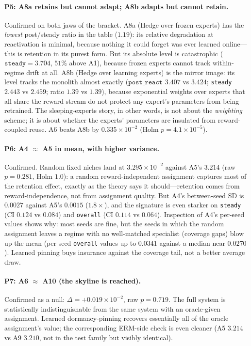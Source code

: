 \paragraph{P5: A8a retains but cannot adapt; A8b adapts but cannot retain.}
Confirmed on both jaws of the bracket. A8a (Hedge over frozen experts) has
the \emph{lowest} post/steady ratio in the table ($1.19$): its relative
degradation at reactivation is minimal, because nothing it could forget was
ever learned online---this is retention in its purest form. But its absolute
level is catastrophic ($\texttt{steady} = 3.704$, $51\%$ above A1), because
frozen experts cannot track within-regime drift at all. A8b (Hedge over
learning experts) is the mirror image: its level tracks the monolith almost
exactly ($\texttt{post\_react}$ $3.407$ vs $3.424$; \texttt{steady} $2.443$
vs $2.459$; ratio $1.39$ vs $1.39$), because exponential weights over
experts that all share the reward stream do not protect any expert's
parameters from being retrained. The sleeping-experts story, in other words,
is not about the \emph{weighting} scheme; it is about whether the experts'
parameters are insulated from reward-coupled reuse. A6 beats A8b by
$0.335\times 10^{-2}$ (Holm $p = 4.1\times 10^{-5}$).

\paragraph{P6: A4 $\approx$ A5 in mean, with higher variance.}
\label{sec:dd5-e1-a4}
Confirmed. Random fixed niches land at $3.295 \times 10^{-2}$ against A5's
$3.214$ (raw $p = 0.281$, Holm $1.0$): a random reward-independent
assignment captures most of the retention effect, exactly as the theory
says it should---retention comes from reward-independence, not from
assignment quality. But A4's between-seed SD is $0.0027$ against A5's
$0.0015$ ($1.8\times$), and the signature is even starker on
\texttt{steady} (CI $0.124$ vs $0.084$) and \texttt{overall} (CI $0.114$ vs
$0.064$). Inspection of A4's per-seed values shows why: most seeds are fine,
but the seeds in which the random assignment leaves a regime with no
well-matched specialist (coverage gaps) blow up the mean (per-seed
\texttt{overall} values up to $0.0341$ against a median near $0.0270$).
Learned pinning buys insurance against the coverage tail, not a better
average draw.

\paragraph{P7: A6 $\approx$ A10 (the skyline is reached).}
Confirmed as a null: $\Delta = +0.019 \times 10^{-2}$, raw $p = 0.719$. The
full system is statistically indistinguishable from the same system with an
oracle-given assignment. Learned dormancy-pinning recovers essentially all
of the oracle assignment's value; the corresponding ERM-side check is even
cleaner (A5 $3.214$ vs A9 $3.210$, not in the test family but visibly
identical).

